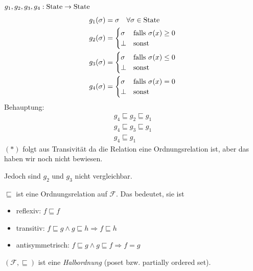 \par\medskip
\begin{example}
    $g_1, g_2, g_3, g_4 : \operatorname{State} \to \operatorname{State}$
    \begin{align*}
        g_1(\sigma) & = \sigma \quad \forall \sigma \in \operatorname{State} \\
        g_2(\sigma) & = \begin{cases}
            \sigma & \text{falls } \sigma(x) \geq 0 \\
            \bot & \text{sonst} \\
        \end{cases} \\
        g_3(\sigma) & = \begin{cases}
            \sigma & \text{falls } \sigma(x) \leq 0 \\
            \bot & \text{sonst} \\
        \end{cases} \\
        g_4(\sigma) & = \begin{cases}
            \sigma & \text{falls } \sigma(x) = 0 \\
            \bot & \text{sonst} \\
        \end{cases} \\
    \end{align*}
    Behauptung:
    \begin{align*}
        g_4 \sqsubseteq g_2 \sqsubseteq g_1 \\
        g_4 \sqsubseteq g_3 \sqsubseteq g_1 \\
        g_4 \sqsubseteq g_1 \tag{*}
    \end{align*}
    $(*)$ folgt aus Transivität da die Relation eine Ordnungsrelation ist, aber das haben wir noch nicht bewiesen.

    Jedoch sind $g_2$ und $g_3$ nicht vergleichbar.
\end{example}

\par\bigskip
\begin{remark}[Fakt]
    $\sqsubseteq$ ist eine Ordnungsrelation auf $\mathcal{F}$. Das bedeutet, sie ist
    \begin{itemize}
        \item reflexiv: $f \sqsubseteq f$
        \item transitiv: $f \sqsubseteq g \wedge g \sqsubseteq h \Rightarrow f \sqsubseteq h$
        \item antisymmetrisch: $f \sqsubseteq g \wedge g \sqsubseteq f \Rightarrow f = g$
    \end{itemize}

    $(\mathcal{F}, \sqsubseteq)$ ist eine \emph{Halbordnung} (poset bzw. partially ordered set).
\end{remark}

